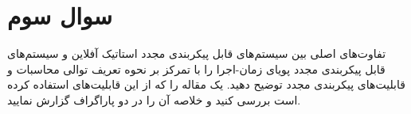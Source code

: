 \section{سوال سوم}



تفاوت‌های اصلی بین سیستم‌های قابل پیکربندی مجدد استاتیک آفلاین و سیستم‌های قابل پیکربندی مجدد پویای زمان-اجرا را با تمرکز بر نحوه تعریف توالی محاسبات و قابلیت‌های پیکربندی مجدد توضیح دهید. یک مقاله را که از این قابلیت‌های  استفاده کرده است بررسی کنید و خلاصه آن را در دو پاراگراف گزارش نمایید.


\begin{qsolve}
	
\end{qsolve}